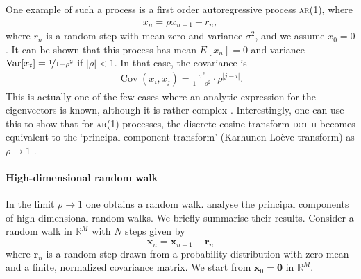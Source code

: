 \documentclass[a4paper, fontsize=9pt, twocolumn]{scrreprt}
\newcommand{\vect}[1]{\mathrm{\mathbf{#1}}}
\newcommand{\R}{\mathbb R}
\newcommand{\vx}{\vect x}
\newcommand{\vr}{\vect r}
\DeclareMathOperator{\Cov}{Cov}
\begin{document}
One example of such a process is a first order autoregressive process \textsc{ar}(1), where
\begin{align}
    x_n = \rho x_{n-1} + r_n,
\end{align}
where $r_n$ is a random step with mean zero and variance $\sigma^2$, and we assume $x_0 = 0$.
It can be shown that this process has mean $E[x_n] = 0$ and variance $\text{Var}[x_t] = \nicefrac{1}{1-\rho^2}$ if $|\rho| < 1$.
In that case, the covariance is
\begin{align}
    \Cov(x_i, x_j) = \frac{\sigma^2}{1-\rho^2} \cdot \rho^{|j-i|}.
\end{align}
This is actually one of the few cases where an analytic expression for the eigenvectors is known, although it is rather complex \parencite{Ray1970,Rao1990}.
Interestingly, one can use this to show that for \textsc{ar}(1) processes, the discrete cosine transform \textsc{dct-ii} becomes equivalent to the `principal component transform' (Karhunen-Loève transform) as $\rho\to 1$ \parencite[section~3.3.2]{Rao1990}.


\paragraph{High-dimensional random walk}

In the limit $\rho \to 1$ one obtains a random walk. 
\textcite{Antognini2018} analyse the principal components of high-dimensional random walks. 
We briefly summarise their results.
Consider a random walk in $\R^M$ with $N$ steps given by 
\begin{equation}
    \vx_n = \vx_{n-1} + \vr_n
    \label{eq:random-walk}
\end{equation}
where $\vr_n$ is a random step drawn from a probability distribution with zero mean and a finite, normalized covariance matrix.
We start from $\vx_0 = \mathbf{0}$ in $\R^M$.
\end{document}
